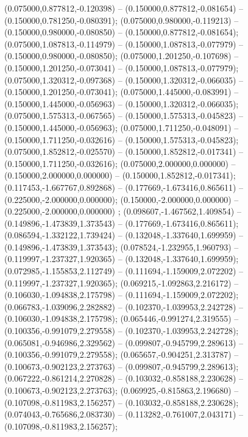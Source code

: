  (0.075000,0.877812,-0.120398) -- (0.150000,0.877812,-0.081654) -- (0.150000,0.781250,-0.080391);
 (0.075000,0.980000,-0.119213) -- (0.150000,0.980000,-0.080850) -- (0.150000,0.877812,-0.081654);
 (0.075000,1.087813,-0.114979) -- (0.150000,1.087813,-0.077979) -- (0.150000,0.980000,-0.080850);
 (0.075000,1.201250,-0.107698) -- (0.150000,1.201250,-0.073041) -- (0.150000,1.087813,-0.077979);
 (0.075000,1.320312,-0.097368) -- (0.150000,1.320312,-0.066035) -- (0.150000,1.201250,-0.073041);
 (0.075000,1.445000,-0.083991) -- (0.150000,1.445000,-0.056963) -- (0.150000,1.320312,-0.066035);
 (0.075000,1.575313,-0.067565) -- (0.150000,1.575313,-0.045823) -- (0.150000,1.445000,-0.056963);
 (0.075000,1.711250,-0.048091) -- (0.150000,1.711250,-0.032616) -- (0.150000,1.575313,-0.045823);
 (0.075000,1.852812,-0.025570) -- (0.150000,1.852812,-0.017341) -- (0.150000,1.711250,-0.032616);
 (0.075000,2.000000,0.000000) -- (0.150000,2.000000,0.000000) -- (0.150000,1.852812,-0.017341);
 (0.117453,-1.667767,0.892868) -- (0.177669,-1.673416,0.865611) -- (0.225000,-2.000000,0.000000);
 (0.150000,-2.000000,0.000000) -- (0.225000,-2.000000,0.000000) ;
 (0.098607,-1.467562,1.409854) -- (0.149896,-1.473839,1.373543) -- (0.177669,-1.673416,0.865611);
 (0.086594,-1.332122,1.739424) -- (0.132048,-1.337640,1.699959) -- (0.149896,-1.473839,1.373543);
 (0.078524,-1.232955,1.960793) -- (0.119997,-1.237327,1.920365) -- (0.132048,-1.337640,1.699959);
 (0.072985,-1.155853,2.112749) -- (0.111694,-1.159009,2.072202) -- (0.119997,-1.237327,1.920365);
 (0.069215,-1.092863,2.216172) -- (0.106030,-1.094838,2.175798) -- (0.111694,-1.159009,2.072202);
 (0.066783,-1.039096,2.282882) -- (0.102370,-1.039953,2.242728) -- (0.106030,-1.094838,2.175798);
 (0.065446,-0.991274,2.319555) -- (0.100356,-0.991079,2.279558) -- (0.102370,-1.039953,2.242728);
 (0.065081,-0.946986,2.329562) -- (0.099807,-0.945799,2.289613) -- (0.100356,-0.991079,2.279558);
 (0.065657,-0.904251,2.313787) -- (0.100673,-0.902123,2.273763) -- (0.099807,-0.945799,2.289613);
 (0.067222,-0.861214,2.270828) -- (0.103032,-0.858188,2.230628) -- (0.100673,-0.902123,2.273763);
 (0.069925,-0.815863,2.196680) -- (0.107098,-0.811983,2.156257) -- (0.103032,-0.858188,2.230628);
 (0.074043,-0.765686,2.083730) -- (0.113282,-0.761007,2.043171) -- (0.107098,-0.811983,2.156257);
